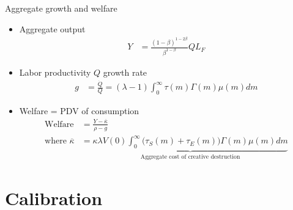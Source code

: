 \documentclass[english,usenames,dvipsnames]{beamer}
\begin{document}
\begin{frame}{Aggregate growth and welfare}
\begin{itemize}
\item Aggregate output
\begin{align*}
	Y &= \frac{(1-\beta)^{1-2\beta}}{\beta^{1-\beta}} Q L_F \label{flow_output}
\end{align*}
\item Labor productivity $Q$ growth rate
\begin{align*}
g &= \frac{\dot{Q}}{Q} = (\lambda -1) \int_0^{\infty} \tau(m) \Gamma(m) \mu(m) dm
\end{align*}
\item Welfare = PDV of consumption
\begin{align*}
	\textrm{Welfare} &= \frac{Y - \overline{\kappa}}{\rho - g} \\
	\textrm{where } \overline{\kappa} &= \underbrace{\kappa \lambda V(0) \int_0^{\infty} \big(\tau_S(m) + \tau_E(m)\big) \Gamma(m) \mu(m) dm}_{\textrm{Aggregate cost of creative destruction}}
\end{align*}
\end{itemize}
\end{frame}


\section{Calibration}


\begin{frame}
\tableofcontents[currentsection]
\end{frame}
\end{document}
